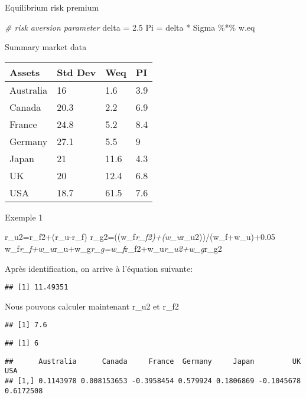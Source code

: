 \documentclass[
]{article}
\newenvironment{Shaded}{\begin{snugshade}}{\end{snugshade}}
\newcommand{\CommentTok}[1]{\textcolor[rgb]{0.56,0.35,0.01}{\textit{#1}}}
\newcommand{\FloatTok}[1]{\textcolor[rgb]{0.00,0.00,0.81}{#1}}
\newcommand{\NormalTok}[1]{#1}
\newcommand{\OtherTok}[1]{\textcolor[rgb]{0.56,0.35,0.01}{#1}}
\newcommand{\SpecialCharTok}[1]{\textcolor[rgb]{0.00,0.00,0.00}{#1}}
\begin{document}
Equilibrium risk premium

\begin{Shaded}
\begin{Highlighting}[]
\CommentTok{\# risk aversion parameter}
\NormalTok{delta }\OtherTok{=} \FloatTok{2.5}
\NormalTok{Pi }\OtherTok{=}\NormalTok{ delta }\SpecialCharTok{*}\NormalTok{ Sigma }\SpecialCharTok{\%*\%}\NormalTok{ w.eq}
\end{Highlighting}
\end{Shaded}

Summary market data

\begin{tabular}{llll}
\toprule
Assets & Std Dev & Weq & PI\\
\midrule
Australia & 16 & 1.6 & 3.9\\
Canada & 20.3 & 2.2 & 6.9\\
France & 24.8 & 5.2 & 8.4\\
Germany & 27.1 & 5.5 & 9\\
Japan & 21 & 11.6 & 4.3\\
\addlinespace
UK & 20 & 12.4 & 6.8\\
USA & 18.7 & 61.5 & 7.6\\
\bottomrule
\end{tabular}

Exemple 1

r\_u2=r\_f2+(r\_u-r\_f)
r\_g2=((w\_f\emph{r\_f2)+(w\_u}r\_u2))/(w\_f+w\_u)+0.05
w\_f\emph{r\_f+w\_u}r\_u+w\_g\emph{r\_g=w\_f}r\_f2+w\_u\emph{r\_u2+w\_g}r\_g2

Après identification, on arrive à l'équation suivante:

\begin{verbatim}
## [1] 11.49351
\end{verbatim}

Nous pouvons calculer maintenant r\_u2 et r\_f2

\begin{verbatim}
## [1] 7.6
\end{verbatim}

\begin{verbatim}
## [1] 6
\end{verbatim}

\begin{verbatim}
##      Australia      Canada     France  Germany     Japan         UK       USA
## [1,] 0.1143978 0.008153653 -0.3958454 0.579924 0.1806869 -0.1045678 0.6172508
\end{verbatim}
\end{document}
